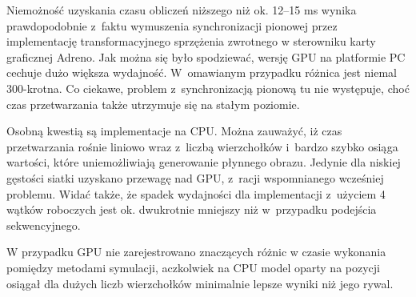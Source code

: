 		Niemożność uzyskania czasu obliczeń niższego niż ok. 12--15 ms wynika prawdopodobnie z~faktu wymuszenia synchronizacji pionowej przez implementację transformacyjnego sprzężenia zwrotnego w sterowniku karty graficznej Adreno. Jak można się było spodziewać, wersję GPU na platformie PC cechuje dużo większa wydajność. W~omawianym przypadku różnica jest niemal 300-krotna. Co ciekawe, problem z~synchronizacją pionową tu nie występuje, choć czas przetwarzania także utrzymuje się na stałym poziomie. 
		
		Osobną kwestią są implementacje na CPU. Można zauważyć, iż czas przetwarzania rośnie liniowo wraz z~liczbą wierzchołków i~bardzo szybko osiąga wartości, które uniemożliwiają generowanie płynnego obrazu. Jedynie dla niskiej gęstości siatki uzyskano przewagę nad GPU, z~racji wspomnianego wcześniej problemu. Widać także, że spadek wydajności dla implementacji z~użyciem 4 wątków roboczych jest ok. dwukrotnie mniejszy niż w~przypadku podejścia sekwencyjnego.
		
		W przypadku GPU nie zarejestrowano znaczących różnic w czasie wykonania pomiędzy metodami symulacji, aczkolwiek na CPU model oparty na pozycji osiągał dla dużych liczb wierzchołków minimalnie lepsze wyniki niż jego rywal.
		
		
		
		
		
		
		
		
		
		
